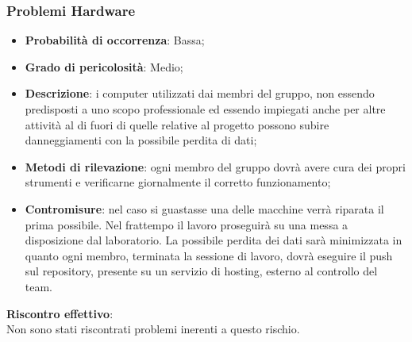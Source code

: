 		\subsubsection{Problemi Hardware} %
		\label{ssub:problemi_hardware}
			\begin{itemize}
				\item \textbf{Probabilità di occorrenza}: Bassa;
				\item \textbf{Grado di pericolosità}: Medio;
				\item \textbf{Descrizione}: i computer utilizzati dai membri del gruppo, non essendo predisposti a uno scopo professionale ed essendo impiegati anche per altre attività al di fuori di quelle relative al progetto possono subire danneggiamenti con la possibile perdita di dati;
				\item \textbf{Metodi di rilevazione}: ogni membro del gruppo dovrà avere cura dei propri strumenti e verificarne giornalmente il corretto funzionamento;
				\item \textbf{Contromisure}: nel caso si guastasse una delle macchine verrà riparata il prima possibile. Nel frattempo il lavoro proseguirà su una messa a disposizione dal laboratorio. La possibile perdita dei dati sarà minimizzata in quanto ogni membro, terminata la sessione di lavoro, dovrà eseguire il push sul repository, presente su un servizio di hosting, esterno al controllo del team.
			\end{itemize}
		\noindent
		\textbf{Riscontro effettivo}: \\
		Non sono stati riscontrati problemi inerenti a questo rischio.
		
